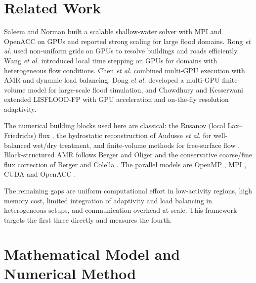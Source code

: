 \documentclass[conference]{IEEEtran}
\begin{document}
\section{Related Work}
Saleem and Norman \cite{saleem2024} built a scalable shallow-water solver with
MPI and OpenACC on GPUs and reported strong scaling for large flood domains.
Rong \emph{et al.} \cite{rong2024} used non-uniform grids on GPUs to resolve
buildings and roads efficiently. Wang \emph{et al.} \cite{wang2024} introduced
local time stepping on GPUs for domains with heterogeneous flow conditions.
Chen \emph{et al.} \cite{chen2025} combined multi-GPU execution with AMR and
dynamic load balancing. Dong \emph{et al.} \cite{dong2025} developed a
multi-GPU finite-volume model for large-scale flood simulation, and Chowdhury
and Kesserwani \cite{chowdhury2025} extended LISFLOOD-FP with GPU acceleration
and on-the-fly resolution adaptivity.

The numerical building blocks used here are classical: the Rusanov
(local Lax--Friedrichs) flux \cite{rusanov1961}, the hydrostatic reconstruction
of Audusse \emph{et al.} \cite{audusse2004} for well-balanced wet/dry
treatment, and finite-volume methods for free-surface flow \cite{toro2001}.
Block-structured AMR follows Berger and Oliger \cite{berger1984} and the
conservative coarse/fine flux correction of Berger and Colella
\cite{berger1989}. The parallel models are OpenMP \cite{dagum1998}, MPI
\cite{gropp2014}, CUDA \cite{nickolls2008} and OpenACC \cite{openacc}.

The remaining gaps are uniform computational effort in low-activity regions,
high memory cost, limited integration of adaptivity and load balancing in
heterogeneous setups, and communication overhead at scale. This framework
targets the first three directly and measures the fourth.

\section{Mathematical Model and Numerical Method}
\end{document}
